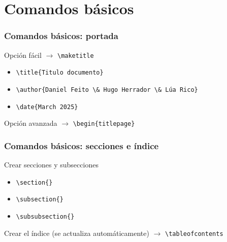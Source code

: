 

\section{Comandos básicos}

\begin{frame}[fragile]
\frametitle{Comandos básicos: portada}

Opción fácil $\rightarrow$ \verb|\maketitle|
\begin{itemize}
     \item \verb|\title{Titulo documento}|
     \item \verb|\author{Daniel Feito \& Hugo Herrador \& Lúa Rico}|
     \item \verb|\date{March 2025}|
\end{itemize}

\vspace{0.5cm}

Opción avanzada $\rightarrow$ \verb|\begin{titlepage}|


\end{frame}

\begin{frame}[fragile]
\frametitle{Comandos básicos: secciones e índice}
Crear secciones y subsecciones
\begin{itemize}
    \item \verb|\section{}|
    \item \verb|\subsection{}|
    \item \verb|\subsubsection{}| 
\end{itemize}

\vspace{0.5cm}

Crear el índice (se actualiza automáticamente) $\rightarrow$ \verb|\tableofcontents|

\end{frame}

